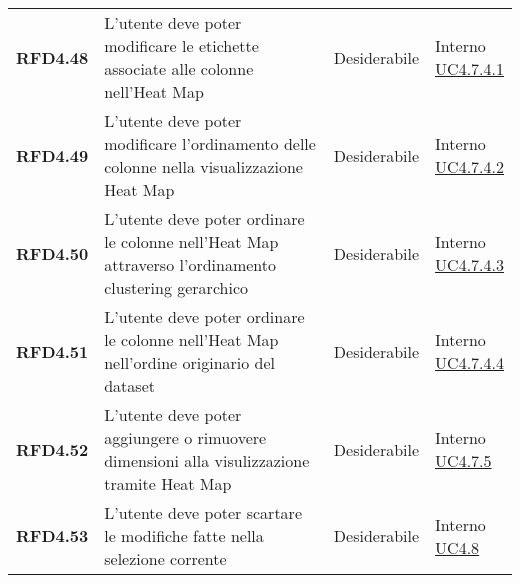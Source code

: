 \begin{longtable}[H]{>{\raggedright\bfseries}m{20mm} >{\raggedright}m{90mm} >{\raggedright}m{28mm} >{\raggedright\arraybackslash}m{30mm}}
    RFD4.48
    & L'utente deve poter modificare le etichette associate alle colonne nell'Heat Map
    & Desiderabile
    & \makecell{ Interno \\  \hyperref[spar:uc4.7.4.1]{UC4.7.4.1} }\\


    RFD4.49
    & L'utente deve poter modificare l'ordinamento delle colonne nella visualizzazione Heat Map
    & Desiderabile
    & \makecell{ Interno \\  \hyperref[spar:uc4.7.4.2]{UC4.7.4.2} }\\

    RFD4.50
    & L'utente deve poter ordinare le colonne nell'Heat Map attraverso l'ordinamento clustering gerarchico
    & Desiderabile
    & \makecell{ Interno \\  \hyperref[spar:uc4.7.4.3]{UC4.7.4.3} }\\

    RFD4.51
    & L'utente deve poter ordinare le colonne nell'Heat Map nell'ordine originario del dataset
    & Desiderabile
    & \makecell{ Interno \\  \hyperref[spar:uc4.7.4.4]{UC4.7.4.4} }\\

    RFD4.52
    & L'utente deve poter aggiungere o rimuovere dimensioni alla visulizzazione tramite Heat Map
    & Desiderabile
    & \makecell{ Interno \\  \hyperref[par:uc4.7.5]{UC4.7.5} }\\

    RFD4.53
    & L'utente deve poter scartare le modifiche fatte nella selezione corrente
    & Desiderabile
    & \makecell{ Interno \\  \hyperref[ssub:uc4.8]{UC4.8} }\\

\end{longtable}
